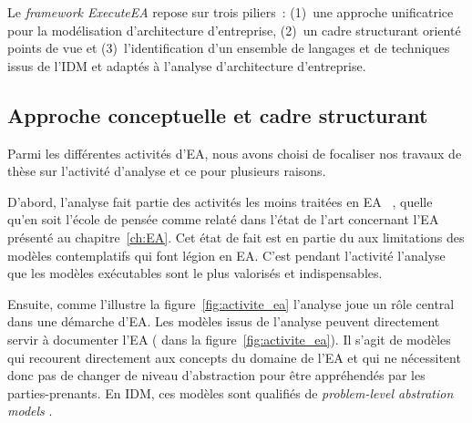     Le \emph{framework ExecuteEA} repose sur trois piliers~: (1)~une approche unificatrice pour la modélisation d'architecture d'entreprise,
    (2)~un cadre structurant orienté points de vue et (3)~l'identification d'un ensemble de langages et de techniques issus de l'IDM
    et adaptés à l'analyse d'architecture d'entreprise.





   \subsection{Approche conceptuelle et cadre structurant}

Parmi les différentes activités d'EA, nous avons choisi de focaliser nos travaux de thèse sur l'activité
d'analyse et ce pour plusieurs raisons.

D'abord, l'analyse fait partie des activités les moins traitées en EA~\cite{chen2008architectures} \cite{barn2013enterprise},
quelle qu'en soit l'école de pensée comme relaté dans l'état 
de l'art concernant l'EA présenté au chapitre~\ref{ch:EA}. Cet état de fait est en partie du
aux limitations des modèles contemplatifs qui font légion en EA. C'est pendant l'activité l'analyse que les modèles
exécutables sont le plus valorisés et indispensables.

Ensuite, comme l'illustre la figure~\ref{fig:activite_ea} l'analyse joue un rôle central dans une démarche d'EA.
Les modèles issus de l'analyse peuvent directement servir à documenter l'EA ( dans la figure~\ref{fig:activite_ea}).
Il s'agit de modèles qui recourent directement aux concepts du domaine de l'EA 
et qui ne nécessitent donc pas de changer de niveau d'abstraction pour être appréhendés par les parties-prenants.
En IDM, ces modèles sont qualifiés de \emph{problem-level abstration models} \cite{france2007model}.

